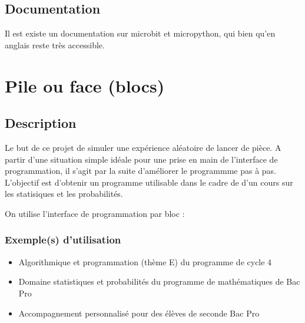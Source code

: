 \documentclass[letterpaper,10pt,french]{sphinxmanual}
\begin{document}
\subsection{Documentation}
\label{\detokenize{decouverte/prise_en_main_python:documentation}}
Il est existe un documentation sur microbit et micropython, qui bien qu’en
anglais reste très accessible.



\section{Pile ou face (blocs)}
\label{\detokenize{decouverte/pileface-bloc:pile-ou-face-blocs}}\label{\detokenize{decouverte/pileface-bloc::doc}}\label{\detokenize{decouverte/pileface-bloc:blocpileface}}

\subsection{Description}
\label{\detokenize{decouverte/pileface-bloc:description}}
Le but de ce projet de simuler une expérience aléatoire de lancer de pièce.
A partir d’une situation simple idéale pour une prise en main de l’interface
de programmation, il s’agit par la suite d’améliorer le programmme pas à pas.
L’objectif est d’obtenir un programme utilisable dans le cadre de d’un cours sur
les statisiques et les probabilités.

On utilise l’interface de programmation par bloc :



\subsubsection{Exemple(s) d’utilisation}
\label{\detokenize{decouverte/pileface-bloc:exemple-s-d-utilisation}}\begin{itemize}
\item {} 
Algorithmique et programmation (thème E) du programme de cycle 4

\item {} 
Domaine statistiques et probabilités du programme de mathématiques de Bac Pro

\item {} 
Accompagnement personnalisé pour des élèves de seconde Bac Pro

\end{itemize}
\end{document}
